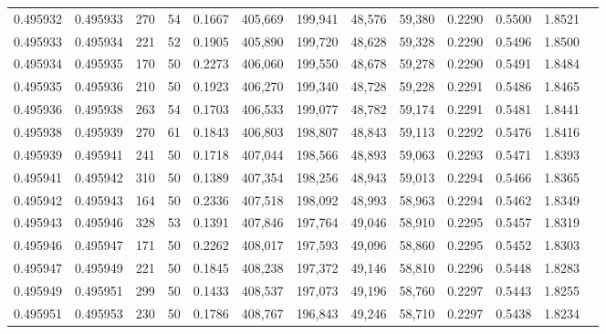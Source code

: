 \begin{tabular}{rrrrrrrrrrrrr}
0.495932 & 0.495933 &   270 &  54 &                                     0.1667 & 405,669 & 199,941 &  48,576 &  59,380 & 0.2290 & 0.5500 & 1.8521 \\
0.495933 & 0.495934 &   221 &  52 &                                     0.1905 & 405,890 & 199,720 &  48,628 &  59,328 & 0.2290 & 0.5496 & 1.8500 \\
0.495934 & 0.495935 &   170 &  50 &                                     0.2273 & 406,060 & 199,550 &  48,678 &  59,278 & 0.2290 & 0.5491 & 1.8484 \\
0.495935 & 0.495936 &   210 &  50 &                                     0.1923 & 406,270 & 199,340 &  48,728 &  59,228 & 0.2291 & 0.5486 & 1.8465 \\
0.495936 & 0.495938 &   263 &  54 &                                     0.1703 & 406,533 & 199,077 &  48,782 &  59,174 & 0.2291 & 0.5481 & 1.8441 \\
0.495938 & 0.495939 &   270 &  61 &                                     0.1843 & 406,803 & 198,807 &  48,843 &  59,113 & 0.2292 & 0.5476 & 1.8416 \\
0.495939 & 0.495941 &   241 &  50 &                                     0.1718 & 407,044 & 198,566 &  48,893 &  59,063 & 0.2293 & 0.5471 & 1.8393 \\
0.495941 & 0.495942 &   310 &  50 &                                     0.1389 & 407,354 & 198,256 &  48,943 &  59,013 & 0.2294 & 0.5466 & 1.8365 \\
0.495942 & 0.495943 &   164 &  50 &                                     0.2336 & 407,518 & 198,092 &  48,993 &  58,963 & 0.2294 & 0.5462 & 1.8349 \\
0.495943 & 0.495946 &   328 &  53 &                                     0.1391 & 407,846 & 197,764 &  49,046 &  58,910 & 0.2295 & 0.5457 & 1.8319 \\
0.495946 & 0.495947 &   171 &  50 &                                     0.2262 & 408,017 & 197,593 &  49,096 &  58,860 & 0.2295 & 0.5452 & 1.8303 \\
0.495947 & 0.495949 &   221 &  50 &                                     0.1845 & 408,238 & 197,372 &  49,146 &  58,810 & 0.2296 & 0.5448 & 1.8283 \\
0.495949 & 0.495951 &   299 &  50 &                                     0.1433 & 408,537 & 197,073 &  49,196 &  58,760 & 0.2297 & 0.5443 & 1.8255 \\
0.495951 & 0.495953 &   230 &  50 &                                     0.1786 & 408,767 & 196,843 &  49,246 &  58,710 & 0.2297 & 0.5438 & 1.8234 \\

\end{tabular}
